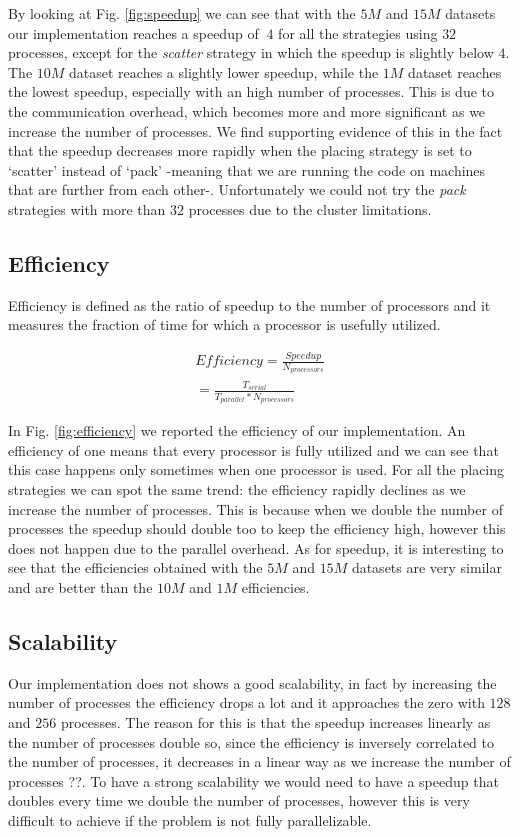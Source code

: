 By looking at Fig. \ref{fig:speedup} we can see that with the $5M$ and $15M$ datasets our implementation reaches a speedup of $~4$ for
all the strategies using $32$ processes, except for the \textit{scatter} strategy in which the speedup
is slightly below $4$.
The $10M$ dataset reaches a slightly lower speedup, while the $1M$ dataset reaches the lowest speedup, especially
with an high number of processes. This is due to the communication overhead, which becomes more and more significant as we increase the number of processes. We find supporting evidence of this in the fact that the speedup decreases more rapidly when the placing strategy is set to `scatter' instead of `pack' -meaning that we are running the code on machines that are further from each other-.
Unfortunately we could not try the \textit{pack} strategies with more than $32$ processes due to the cluster limitations.

\subsection{Efficiency}
Efficiency is defined as the ratio of speedup to the
number of processors and it measures the fraction of
time for which a processor is usefully utilized.

\begin{equation}
  \begin{split}
    Efficiency = \frac{Speedup}{N_{processors}} \\
    = \frac{T_{serial}}{T_{parallel} * N_{processors}}
  \end{split}
\end{equation}

In Fig. \ref{fig:efficiency} we reported the efficiency of our implementation.
An efficiency of one means that every processor is fully utilized and we can see that
this case happens only sometimes when one processor is used.
For all the placing strategies we can spot the same trend: the efficiency rapidly declines as we
increase the number of processes. This is because when we double the number of processes the speedup should
double too to keep the efficiency high, however this does not happen due to the parallel overhead.
As for speedup, it is interesting to see that the efficiencies obtained with the $5M$ and $15M$ datasets are very similar and are
better than the $10M$ and $1M$ efficiencies.

\subsection{Scalability}
Our implementation does not shows a good scalability, in fact by increasing the
number of processes the efficiency drops a lot and it approaches the zero with
$128$ and $256$ processes. The reason for this is that the speedup increases linearly as
the number of processes double so, since the efficiency is inversely correlated to the number
of processes, it decreases in a linear way as we increase the number of processes ??.
To have a strong scalability we would need to have a speedup that doubles every time we double the
number of processes, however this is very difficult to achieve if the problem
is not fully parallelizable.